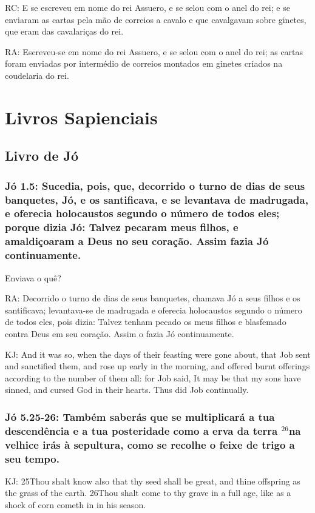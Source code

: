 RC: E se escreveu em nome do rei Assuero, e se selou com o anel do rei; e se enviaram as cartas pela mão de correios a cavalo e que cavalgavam sobre ginetes, que eram das cavalariças do rei.

RA: Escreveu-se em nome do rei Assuero, e se selou com o anel do rei; as cartas foram enviadas por intermédio de correios montados em ginetes criados na coudelaria do rei.

\chapter{Livros Sapienciais}
\section{Livro de Jó}
\subsection{Jó 1.5: Sucedia, pois, que, decorrido o turno de dias de seus banquetes,  Jó, e os santificava, e se levantava de madrugada, e oferecia holocaustos segundo o número de todos eles; porque dizia Jó: Talvez pecaram meus filhos, e amaldiçoaram a Deus no seu coração. Assim fazia Jó continuamente.}
Enviava o quê?

RA: Decorrido o turno de dias de seus banquetes, chamava Jó a seus filhos e os santificava; levantava-se de madrugada e oferecia holocaustos segundo o número de todos eles, pois dizia: Talvez tenham pecado os meus filhos e blasfemado contra Deus em seu coração. Assim o fazia Jó continuamente.

KJ: And it was so, when the days of their feasting were gone about, that Job sent and sanctified them, and rose up early in the morning, and offered burnt offerings according to the number of them all: for Job said, It may be that my sons have sinned, and cursed God in their hearts. Thus did Job continually.

\subsection{Jó 5.25-26: Também saberás que se multiplicará a tua descendência e a tua posteridade como a erva da terra\uwave{,} $^{\mathrm{26}}$na velhice irás à sepultura, como se recolhe o feixe de trigo a seu tempo.}

KJ: 25Thou shalt know also that thy seed shall be great, and thine offspring as the grass of the earth. 26Thou shalt come to thy grave in a full age, like as a shock of corn cometh in in his season.

